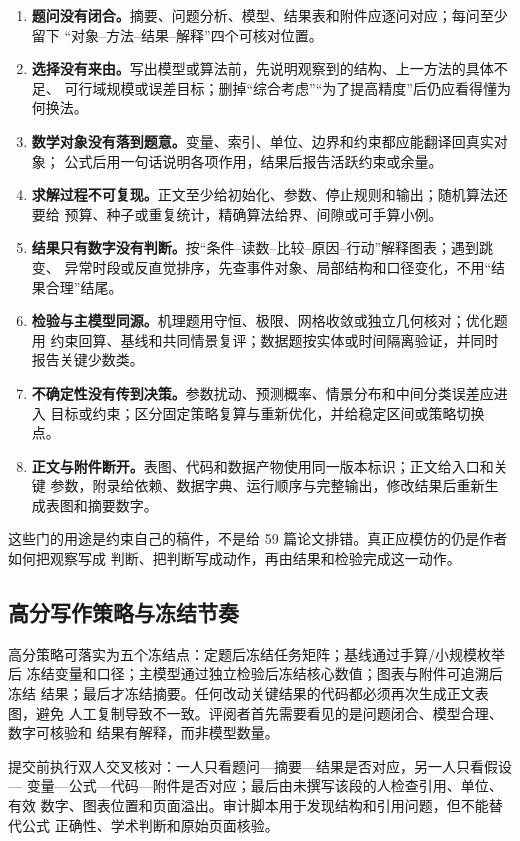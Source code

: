 \documentclass[UTF8,a4paper,12pt]{ctexart}
\begin{document}
\begin{enumerate}
  \item \textbf{题问没有闭合。}摘要、问题分析、模型、结果表和附件应逐问对应；每问至少留下
  “对象--方法--结果--解释”四个可核对位置。
  \item \textbf{选择没有来由。}写出模型或算法前，先说明观察到的结构、上一方法的具体不足、
  可行域规模或误差目标；删掉“综合考虑”“为了提高精度”后仍应看得懂为何换法。
  \item \textbf{数学对象没有落到题意。}变量、索引、单位、边界和约束都应能翻译回真实对象；
  公式后用一句话说明各项作用，结果后报告活跃约束或余量。
  \item \textbf{求解过程不可复现。}正文至少给初始化、参数、停止规则和输出；随机算法还要给
  预算、种子或重复统计，精确算法给界、间隙或可手算小例。
  \item \textbf{结果只有数字没有判断。}按“条件--读数--比较--原因--行动”解释图表；遇到跳变、
  异常时段或反直觉排序，先查事件对象、局部结构和口径变化，不用“结果合理”结尾。
  \item \textbf{检验与主模型同源。}机理题用守恒、极限、网格收敛或独立几何核对；优化题用
  约束回算、基线和共同情景复评；数据题按实体或时间隔离验证，并同时报告关键少数类。
  \item \textbf{不确定性没有传到决策。}参数扰动、预测概率、情景分布和中间分类误差应进入
  目标或约束；区分固定策略复算与重新优化，并给稳定区间或策略切换点。
  \item \textbf{正文与附件断开。}表图、代码和数据产物使用同一版本标识；正文给入口和关键
  参数，附录给依赖、数据字典、运行顺序与完整输出，修改结果后重新生成表图和摘要数字。
\end{enumerate}

这些门的用途是约束自己的稿件，不是给 59 篇论文排错。真正应模仿的仍是作者如何把观察写成
判断、把判断写成动作，再由结果和检验完成这一动作。
\subsection{高分写作策略与冻结节奏}

高分策略可落实为五个冻结点：定题后冻结任务矩阵；基线通过手算/小规模枚举后
冻结变量和口径；主模型通过独立检验后冻结核心数值；图表与附件可追溯后冻结
结果；最后才冻结摘要。任何改动关键结果的代码都必须再次生成正文表图，避免
人工复制导致不一致。评阅者首先需要看见的是问题闭合、模型合理、数字可核验和
结果有解释，而非模型数量。

提交前执行双人交叉核对：一人只看题问—摘要—结果是否对应，另一人只看假设—
变量—公式—代码—附件是否对应；最后由未撰写该段的人检查引用、单位、有效
数字、图表位置和页面溢出。审计脚本用于发现结构和引用问题，但不能替代公式
正确性、学术判断和原始页面核验。
\end{document}
